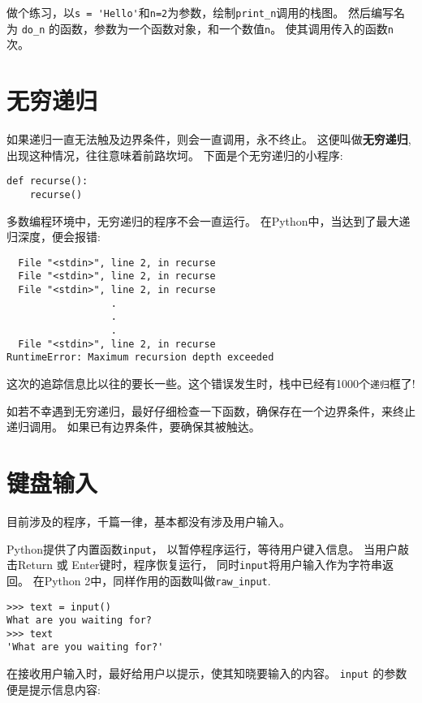 \documentclass[10pt]{book}
\begin{document}
做个练习，以\verb"s = 'Hello'"和{\tt n=2}为参数，绘制\verb"print_n"调用的栈图。
然后编写名为 \verb"do_n" 的函数，参数为一个函数对象，和一个数值{\tt n}。
使其调用传入的函数{\tt n} 次。


\section{无穷递归}

如果递归一直无法触及边界条件，则会一直调用，永不终止。
这便叫做{\bf 无穷递归}, 出现这种情况，往往意味着前路坎坷。
下面是个无穷递归的小程序:

\begin{verbatim}
def recurse():
    recurse()
\end{verbatim}
%
多数编程环境中，无穷递归的程序不会一直运行。
在Python中，当达到了最大递归深度，便会报错:

\begin{verbatim}
  File "<stdin>", line 2, in recurse
  File "<stdin>", line 2, in recurse
  File "<stdin>", line 2, in recurse
                  .   
                  .
                  .
  File "<stdin>", line 2, in recurse
RuntimeError: Maximum recursion depth exceeded
\end{verbatim}
%
这次的追踪信息比以往的要长一些。这个错误发生时，栈中已经有1000个{\tt 递归}框了!

如若不幸遇到无穷递归，最好仔细检查一下函数，确保存在一个边界条件，来终止递归调用。
如果已有边界条件，要确保其被触达。


\section{键盘输入}

目前涉及的程序，千篇一律，基本都没有涉及用户输入。

Python提供了内置函数{\tt input}， 以暂停程序运行，等待用户键入信息。
当用户敲击{\sf  Return} 或 {\sf Enter}键时，程序恢复运行，
同时\verb"input"将用户输入作为字符串返回。
在Python 2中，同样作用的函数叫做\verb"raw_input".

\begin{verbatim}
>>> text = input()
What are you waiting for?
>>> text
'What are you waiting for?'
\end{verbatim}
%
在接收用户输入时，最好给用户以提示，使其知晓要输入的内容。
 \verb"input" 的参数便是提示信息内容:
\end{document}

